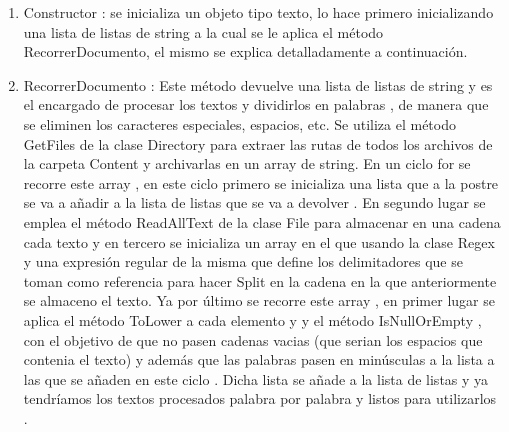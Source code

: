 \documentclass[10pt]{extarticle}
\begin{document}
   \begin{enumerate}
   	\item  Constructor : se inicializa un objeto tipo texto, lo hace primero inicializando una lista 
   	de listas de string a la cual  se le aplica el método RecorrerDocumento, el mismo se explica detalladamente a continuación. 
   	\item RecorrerDocumento : Este método devuelve una lista de listas de string y es el encargado de procesar los textos y 
   	dividirlos en palabras , de manera que se eliminen los caracteres especiales, espacios, etc. 
   	Se utiliza el método GetFiles de la clase Directory para extraer las rutas de todos los archivos de la 
   	carpeta Content y archivarlas en un array de string. En un ciclo for se recorre este array , en este 
   	ciclo primero se inicializa una lista que a la postre se va a añadir a la lista de listas que se va a 
   	devolver . En segundo lugar se emplea el método ReadAllText de la clase File para almacenar en 
   	una cadena cada texto y en tercero se inicializa un array en el que usando la clase Regex y una 
   	expresión regular de la misma que define los delimitadores que se toman como referencia para 
   	hacer Split en la cadena en la que anteriormente se almaceno el texto. Ya por último se recorre 
   	este array , en primer lugar se aplica el método ToLower a cada elemento y y el método 
   	IsNullOrEmpty , con el objetivo de que no pasen cadenas vacias (que serian los espacios que 
   	contenia el texto) y además que las palabras pasen en minúsculas a la lista a las que se añaden en 
   	este ciclo . Dicha lista se añade a la lista de listas y ya tendríamos los textos procesados palabra 
   	por palabra y listos para utilizarlos .
   	 

\end{enumerate}
\end{document}
